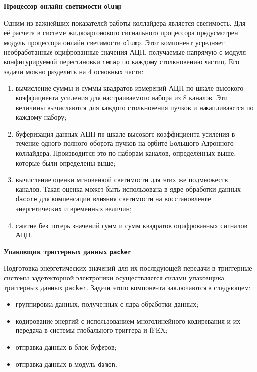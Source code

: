 \textbf{Процессор онлайн светимости \texttt{olump}}\par
Одним из важнейших показателей работы коллайдера является светимость. Для её расчета в системе жидкоаргонового сигнального процессора предусмотрен модуль процессора онлайн светимости \texttt{olump}. Этот компонент усредняет необработанные оцифрованные значения АЦП, получаемые напрямую с модуля конфигурируемой перестановки \texttt{remap} по каждому столкновению частиц. Его задачи можно разделить на 4 основных части:\par
\begin{enumerate}
    \item вычисление суммы и суммы квадратов измерений АЦП по шкале высокого коэффициента усиления для настраиваемого набора из 8 каналов. Эти величины вычисляются для каждого столкновения пучков и накапливаются по каждому набору;
    \item буферизация данных АЦП по шкале высокого коэффициента усиления в течение одного полного оборота пучков на орбите Большого Адронного коллайдера. Производится это по наборам каналов, определённых выше, которые были определены выше;
    \item вычисление оценки мгновенной светимости для этих же подмножеств каналов. Такая оценка может быть использована в ядре обработки данных \texttt{dacore} для компенсации влияния светимости на восстановление энергетических и временных величин;
    \item сжатие без потерь значений сумм и сумм квадратов оцифрованных сигналов АЦП.
\end{enumerate}\par
\textbf{Упаковщик триггерных данных \texttt{packer}}\par
Подготовка энергетических значений для их последующей передачи в триггерные системы задетекторной электроники осуществляется силами упаковщика триггерных данных \texttt{packer}. Задачи этого компонента заключаются в следующем:\par
\begin{itemize}
    \item группировка данных, полученных с ядра обработки данных;
    \item кодирование энергий с использованием многолинейного кодирования и их передача в системы глобального триггера и fFEX;
    \item отправка данных в блок буферов;
    \item отправка данных в модуль \texttt{damon}.
\end{itemize}\par
